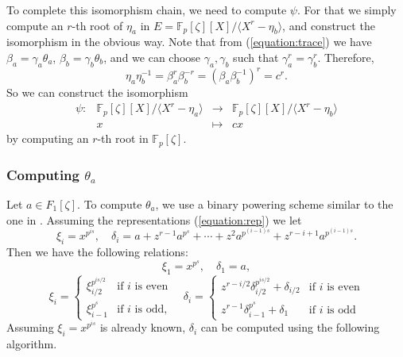 \documentclass[12pt]{article}
\theoremstyle{plain}
\theoremstyle{definition}
\def\F{\ensuremath{\mathbb{F}}}
\newcounter{algorithm}
\begin{document}
To complete this isomorphism chain, we need to compute $\psi$. For that we simply compute an $r$-th 
root of $\eta_a$ in $E = \F_p[\zeta][X] / \langle X^r - \eta_b \rangle$, and construct the 
isomorphism in the obvious way. Note that from (\ref{equation:trace}) we have $\beta_a = 
\gamma_a\theta_a$,  $\beta_b = \gamma_b\theta_b$, and we can choose $\gamma_a, \gamma_b$
such that $\gamma_a^r = \gamma_b^r$. Therefore, 
\[ \eta_a\eta_b^{-1} = \beta_a^r\beta_b^{-r} = (\beta_a\beta_b^{-1})^r = c^r. \] 
So we can construct the isomorphism
\begin{equation*}
	\begin{array}{rrll}
	\psi: & \F_p[\zeta][X] / \langle X^r - \eta_a \rangle & \longrightarrow & \F_p[\zeta][X] / 
	\langle X^r - \eta_b \rangle \\
	& x & \longmapsto & cx
	\end{array}
\end{equation*}
by computing an $r$-th root in $\F_p[\zeta]$.





\subsubsection{Computing $\theta_a$}

Let $a \in F_1[\zeta]$. To compute $\theta_a$, we use a binary powering scheme similar to the one 
in \cite{doliskanischost2011}. Assuming the representations (\ref{equation:rep}) we let 
\[
\xi_i = x^{p^{is}}, \quad
\delta_i = a + z^{r - 1}a^{p^s} + \cdots + z^2a^{p^{(i - 1)s}} + z^{r - i + 1} a^{p^{(i - 1)s}}.
\]
Then we have the following relations:
\[\xi_1 = x^{p^s}, \quad \delta_1 = a, \]
\[
\xi_i =
\begin{cases}
\xi_{i / 2}^{p^{is / 2}} & \text{if $i$ is even}  \\
\xi_{i - 1}^{p^s} & \text{if $i$ is odd,}
\end{cases} \quad
\delta_i=
\begin{cases}
z^{r - i / 2}\delta_{i / 2}^{p^{is / 2}} + \delta_{i / 2} & \text{if $i$ is even} \\
z^{r - 1}\delta_{i - 1}^{p^s} + \delta_1 & \text{if $i$ is odd}
\end{cases}
\]
Assuming $\xi_i = x^{p^{is}}$ is already known, $\delta_i$ can be computed using the following 
algorithm.
\end{document}
